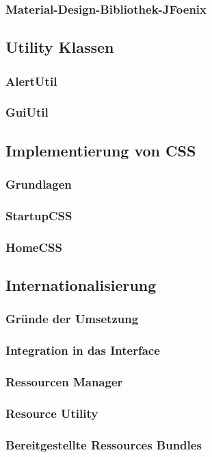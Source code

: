 \subsubsection{Material-Design-Bibliothek-JFoenix}

\subsection{Utility Klassen}
\subsubsection{AlertUtil}
\subsubsection{GuiUtil}


\subsection{Implementierung von CSS}
\subsubsection{Grundlagen}
\subsubsection{StartupCSS}
\subsubsection{HomeCSS}
\subsection{Internationalisierung}
\subsubsection{Gründe der Umsetzung}
\subsubsection{Integration in das Interface}
\subsubsection{Ressourcen Manager}
\subsubsection{Resource Utility}
\subsubsection{Bereitgestellte Ressources Bundles}

